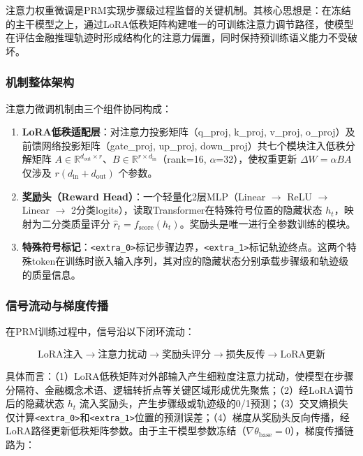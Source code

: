 \documentclass[professional,privacy,print,win,long,STEM,AutoFakeBold]{def/buaa}
\begin{document}
注意力权重微调是PRM实现步骤级过程监督的关键机制。其核心思想是：在冻结的主干模型之上，通过LoRA低秩矩阵构建唯一的可训练注意力调节路径，使模型在评估金融推理轨迹时形成结构化的注意力偏置，同时保持预训练语义能力不受破坏。

\subsubsection{机制整体架构}

注意力微调机制由三个组件协同构成：

\begin{enumerate}
    \item \textbf{LoRA低秩适配层}：对注意力投影矩阵（q\_proj, k\_proj, v\_proj, o\_proj）及前馈网络投影矩阵（gate\_proj, up\_proj, down\_proj）共七个模块注入低秩分解矩阵 $A \in \mathbb{R}^{d_{\text{out}} \times r}$、$B \in \mathbb{R}^{r \times d_{\text{in}}}$（rank=16, $\alpha$=32），使权重更新 $\Delta W = \alpha BA$ 仅涉及 $r(d_{\text{in}} + d_{\text{out}})$ 个参数。

    \item \textbf{奖励头（Reward Head）}：一个轻量化2层MLP（Linear $\rightarrow$ ReLU $\rightarrow$ Linear $\rightarrow$ 2分类logits），读取Transformer在特殊符号位置的隐藏状态 $h_t$，映射为二分类质量评分 $\hat{r}_t = f_{\text{score}}(h_t)$。奖励头是唯一进行全参数训练的模块。

    \item \textbf{特殊符号标记}：\texttt{<extra\_0>}标记步骤边界，\texttt{<extra\_1>}标记轨迹终点。这两个特殊token在训练时嵌入输入序列，其对应的隐藏状态分别承载步骤级和轨迹级的质量信息。
\end{enumerate}

\subsubsection{信号流动与梯度传播}

在PRM训练过程中，信号沿以下闭环流动：

\[
\text{LoRA注入} \rightarrow \text{注意力扰动} \rightarrow \text{奖励头评分} \rightarrow \text{损失反传} \rightarrow \text{LoRA更新}
\]

具体而言：（1）LoRA低秩矩阵对外部输入产生细粒度注意力扰动，使模型在步骤分隔符、金融概念术语、逻辑转折点等关键区域形成优先聚焦；（2）经LoRA调节后的隐藏状态 $h_t$ 流入奖励头，产生步骤级或轨迹级的0/1预测；（3）交叉熵损失仅计算\texttt{<extra\_0>}和\texttt{<extra\_1>}位置的预测误差；（4）梯度从奖励头反向传播，经LoRA路径更新低秩矩阵参数。由于主干模型参数冻结（$\nabla \theta_{\text{base}} = 0$），梯度传播链路为：
\end{document}
